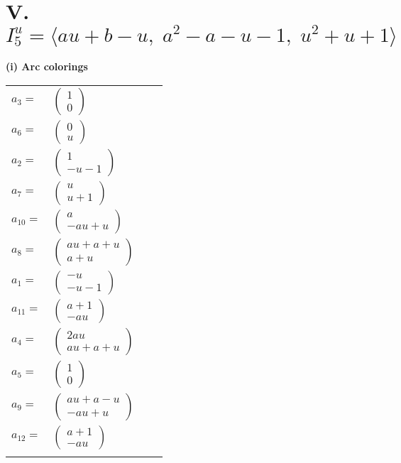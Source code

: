 \documentclass[1p]{elsarticle_modified}
\theoremstyle{definition}
\begin{document}
\centering \section*{V. $I^u_{5}= \langle a u+b- u,\;a^2- a- u-1,\;u^2+u+1 \rangle$}
\flushleft \textbf{(i) Arc colorings}\\
\begin{tabular}{m{7pt} m{180pt} m{7pt} m{180pt} }
\flushright $a_{3}=$&$\begin{pmatrix}1\\0\end{pmatrix}$ \\
\flushright $a_{6}=$&$\begin{pmatrix}0\\u\end{pmatrix}$ \\
\flushright $a_{2}=$&$\begin{pmatrix}1\\- u-1\end{pmatrix}$ \\
\flushright $a_{7}=$&$\begin{pmatrix}u\\u+1\end{pmatrix}$ \\
\flushright $a_{10}=$&$\begin{pmatrix}a\\- a u+u\end{pmatrix}$ \\
\flushright $a_{8}=$&$\begin{pmatrix}a u+a+u\\a+u\end{pmatrix}$ \\
\flushright $a_{1}=$&$\begin{pmatrix}- u\\- u-1\end{pmatrix}$ \\
\flushright $a_{11}=$&$\begin{pmatrix}a+1\\- a u\end{pmatrix}$ \\
\flushright $a_{4}=$&$\begin{pmatrix}2 a u\\a u+a+u\end{pmatrix}$ \\
\flushright $a_{5}=$&$\begin{pmatrix}1\\0\end{pmatrix}$ \\
\flushright $a_{9}=$&$\begin{pmatrix}a u+a- u\\- a u+u\end{pmatrix}$ \\
\flushright $a_{12}=$&$\begin{pmatrix}a+1\\- a u\end{pmatrix}$\\&\end{tabular}
\end{document}
